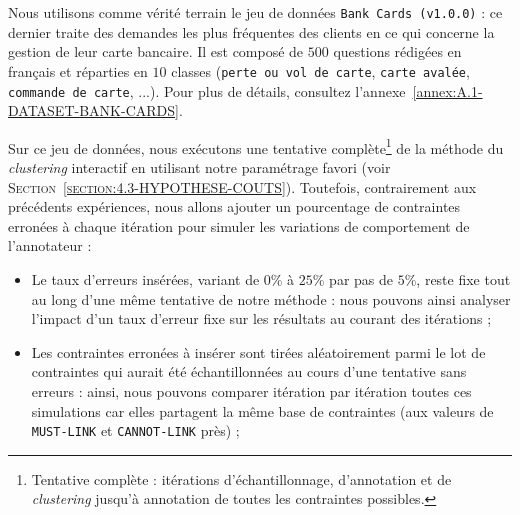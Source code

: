 			Nous utilisons comme vérité terrain le jeu de données \texttt{Bank Cards (v1.0.0)} : ce dernier traite des demandes les plus fréquentes des clients en ce qui concerne la gestion de leur carte bancaire.
			Il est composé de $500$ questions rédigées en français et réparties en $10$ classes (\texttt{perte ou vol de carte}, \texttt{carte avalée}, \texttt{commande de carte}, ...).
			Pour plus de détails, consultez l'annexe~\ref{annex:A.1-DATASET-BANK-CARDS}.
			
			Sur ce jeu de données, nous exécutons une tentative complète\footnote{
				Tentative complète : itérations d'échantillonnage, d'annotation et de \textit{clustering} jusqu'à annotation de toutes les contraintes possibles.
			} de la méthode du \textit{clustering} interactif en utilisant notre paramétrage favori (voir \textsc{Section~\ref{section:4.3-HYPOTHESE-COUTS}}).
			Toutefois, contrairement aux précédents expériences, nous allons ajouter un pourcentage de contraintes erronées à chaque itération pour simuler les variations de comportement de l'annotateur :
			\begin{itemize}
				\item Le taux d'erreurs insérées, variant de $0$\% à $25$\% par pas de $5$\%, reste fixe tout au long d'une même tentative de notre méthode : nous pouvons ainsi analyser l'impact d'un taux d'erreur fixe sur les résultats au courant des itérations ;
				\item Les contraintes erronées à insérer sont tirées aléatoirement parmi le lot de contraintes qui aurait été échantillonnées au cours d'une tentative sans erreurs : ainsi, nous pouvons comparer itération par itération toutes ces simulations car elles partagent la même base de contraintes (aux valeurs de \texttt{MUST-LINK} et \texttt{CANNOT-LINK} près) ;
			\end{itemize}
			
